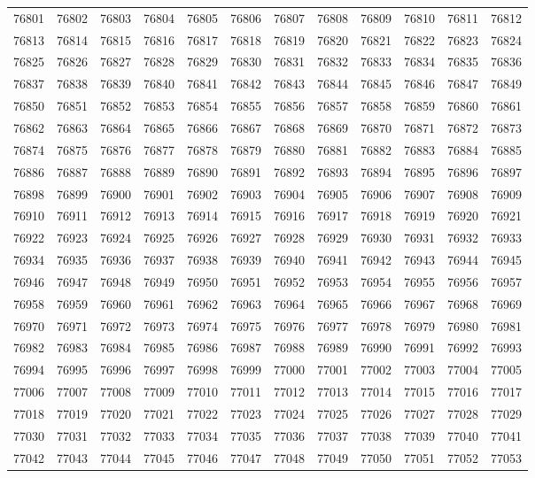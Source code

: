 \begin{center}
\begin{longtable}{llllllllllll}
76801 &76802 &76803 &76804 &76805 &76806 &76807 &76808 &76809 &76810 &76811 &76812 \\
76813 &76814 &76815 &76816 &76817 &76818 &76819 &76820 &76821 &76822 &76823 &76824 \\
76825 &76826 &76827 &76828 &76829 &76830 &76831 &76832 &76833 &76834 &76835 &76836 \\
76837 &76838 &76839 &76840 &76841 &76842 &76843 &76844 &76845 &76846 &76847 &76849 \\
76850 &76851 &76852 &76853 &76854 &76855 &76856 &76857 &76858 &76859 &76860 &76861 \\
76862 &76863 &76864 &76865 &76866 &76867 &76868 &76869 &76870 &76871 &76872 &76873 \\
76874 &76875 &76876 &76877 &76878 &76879 &76880 &76881 &76882 &76883 &76884 &76885 \\
76886 &76887 &76888 &76889 &76890 &76891 &76892 &76893 &76894 &76895 &76896 &76897 \\
76898 &76899 &76900 &76901 &76902 &76903 &76904 &76905 &76906 &76907 &76908 &76909 \\
76910 &76911 &76912 &76913 &76914 &76915 &76916 &76917 &76918 &76919 &76920 &76921 \\
76922 &76923 &76924 &76925 &76926 &76927 &76928 &76929 &76930 &76931 &76932 &76933 \\
76934 &76935 &76936 &76937 &76938 &76939 &76940 &76941 &76942 &76943 &76944 &76945 \\
76946 &76947 &76948 &76949 &76950 &76951 &76952 &76953 &76954 &76955 &76956 &76957 \\
76958 &76959 &76960 &76961 &76962 &76963 &76964 &76965 &76966 &76967 &76968 &76969 \\
76970 &76971 &76972 &76973 &76974 &76975 &76976 &76977 &76978 &76979 &76980 &76981 \\
76982 &76983 &76984 &76985 &76986 &76987 &76988 &76989 &76990 &76991 &76992 &76993 \\
76994 &76995 &76996 &76997 &76998 &76999 &77000 &77001 &77002 &77003 &77004 &77005 \\
77006 &77007 &77008 &77009 &77010 &77011 &77012 &77013 &77014 &77015 &77016 &77017 \\
77018 &77019 &77020 &77021 &77022 &77023 &77024 &77025 &77026 &77027 &77028 &77029 \\
77030 &77031 &77032 &77033 &77034 &77035 &77036 &77037 &77038 &77039 &77040 &77041 \\
77042 &77043 &77044 &77045 &77046 &77047 &77048 &77049 &77050 &77051 &77052 &77053 \\

\end{longtable}
\end{center}
